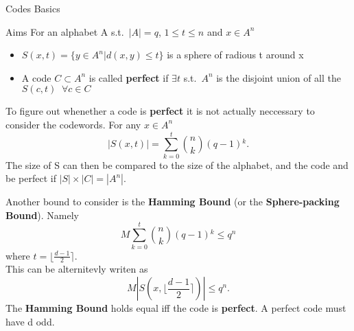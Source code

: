 \documentclass[12pt, letterpaper]{article}
\begin{document}
\begin{section}{Codes Basics}
\begin{subsection}{Aims}
    For an alphabet A s.t.\ \(| A | = q\), \(1 \leq t \leq n\) and
    \(x \in A^{n}\)
    \begin{itemize}
      \item \(S(x, t) = \{ y \in A^{n} | d(x, y) \leq t\}\) is a sphere of
            radious t around x
      \item A code \(C \subset A^{n}\) is called \textbf{perfect} if
            \(\exists t\) s.t.\ \(A^{n}\) is the disjoint union of all the
            \(S(c, t) \;\; \forall c \in C\)
    \end{itemize}

    To figure out whenether a code is \textbf{perfect} it is not actually
    neccessary to consider the codewords. For any \(x \in A^{n}\)
    \[| S(x, t) | = \sum^{t}_{k = 0} {{n}\choose{k}} (q - 1){}^{k}.\]
    The size of S can then be compared to the size of the alphabet, and the
    code and be perfect if \(| S | \times | C | = | A^{n} |\).

    \newpage

    Another bound to consider is the \textbf{Hamming Bound} (or the
    \textbf{Sphere-packing Bound}). Namely
    \[M \sum^{t}_{k = 0} {{n}\choose{k}} (q - 1){}^{k} \leq q^{n}\] where
    \(t = \lfloor \frac{d - 1}{2} \rceil\). \\
    This can be alternitevly writen as
    \[M | S(x, \lfloor \frac{d - 1}{2} \rceil) | \leq q^{n}.\]
    The \textbf{Hamming Bound} holds equal iff the code is \textbf{perfect}.
    A perfect code must have d odd.

  \end{subsection}

\end{section}
\end{document}
